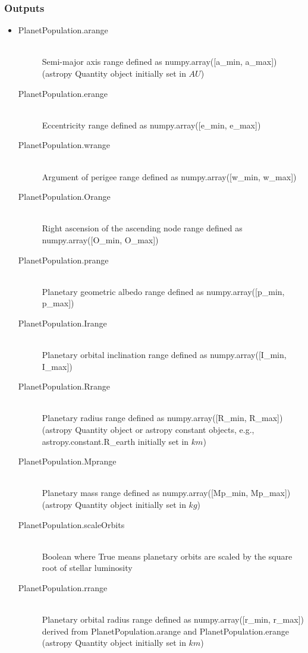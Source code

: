 \documentclass[cleanfoot]{asme2ej}
\begin{document}
\subsubsection*{Outputs}
\begin{itemize}
    \item
    \begin{description}
        \item[PlanetPopulation.arange] \hfill \\
        Semi-major axis range defined as numpy.array([a\_min, a\_max]) (astropy Quantity object initially set in $ AU $)
        \item[PlanetPopulation.erange] \hfill \\
        Eccentricity range defined as numpy.array([e\_min, e\_max])
        \item[PlanetPopulation.wrange] \hfill \\
        Argument of perigee range defined as numpy.array([w\_min, w\_max])
        \item[PlanetPopulation.Orange] \hfill \\
        Right ascension of the ascending node range defined as numpy.array([O\_min, O\_max])
        \item[PlanetPopulation.prange] \hfill \\
        Planetary geometric albedo range defined as numpy.array([p\_min, p\_max])
        \item[PlanetPopulation.Irange] \hfill \\
        Planetary orbital inclination range defined as numpy.array([I\_min, I\_max])
        \item[PlanetPopulation.Rrange] \hfill \\
        Planetary radius range defined as numpy.array([R\_min, R\_max]) (astropy Quantity object or astropy constant objects, e.g., astropy.constant.R\_earth initially set in $ km $)
        \item[PlanetPopulation.Mprange] \hfill \\
        Planetary mass range defined as numpy.array([Mp\_min, Mp\_max]) (astropy Quantity object initially set in $ kg $)
        \item[PlanetPopulation.scaleOrbits] \hfill \\
        Boolean where True means planetary orbits are scaled by the square root of stellar luminosity
        \item[PlanetPopulation.rrange] \hfill \\
        Planetary orbital radius range defined as numpy.array([r\_min, r\_max]) derived from PlanetPopulation.arange and PlanetPopulation.erange (astropy Quantity object initially set in $ km $)
        
    \end{description}
\end{itemize}
\end{document}
